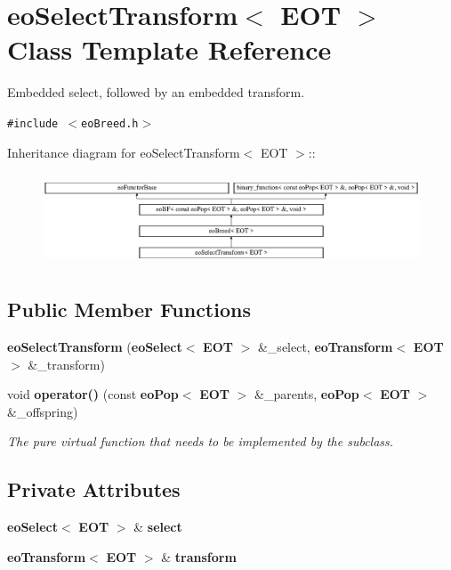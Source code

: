 \section{eo\-Select\-Transform$<$ EOT $>$ Class Template Reference}
\label{classeo_select_transform}
Embedded select, followed by an embedded transform.  


{\tt \#include $<$eo\-Breed.h$>$}

Inheritance diagram for eo\-Select\-Transform$<$ EOT $>$::\begin{figure}[H]
\begin{center}
\leavevmode
\includegraphics[height=2.75184cm]{classeo_select_transform}
\end{center}
\end{figure}
\subsection*{Public Member Functions}
\begin{CompactItemize}
\item 
{\bf eo\-Select\-Transform} ({\bf eo\-Select}$<$ {\bf EOT} $>$ \&\_\-select, {\bf eo\-Transform}$<$ {\bf EOT} $>$ \&\_\-transform)\label{classeo_select_transform_a0}

\item 
void {\bf operator()} (const {\bf eo\-Pop}$<$ {\bf EOT} $>$ \&\_\-parents, {\bf eo\-Pop}$<$ {\bf EOT} $>$ \&\_\-offspring)\label{classeo_select_transform_a1}

\begin{CompactList}\small\item\em The pure virtual function that needs to be implemented by the subclass. \item\end{CompactList}\end{CompactItemize}
\subsection*{Private Attributes}
\begin{CompactItemize}
\item 
{\bf eo\-Select}$<$ {\bf EOT} $>$ \& {\bf select}\label{classeo_select_transform_r0}

\item 
{\bf eo\-Transform}$<$ {\bf EOT} $>$ \& {\bf transform}\label{classeo_select_transform_r1}

\end{CompactItemize}


